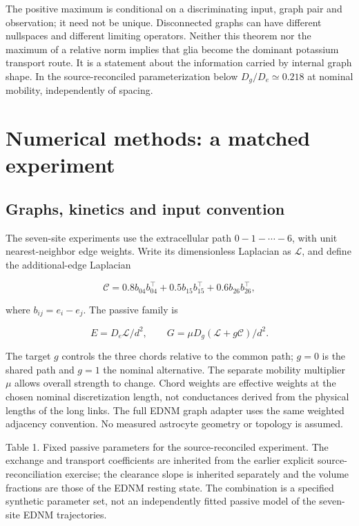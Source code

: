 \documentclass[
  11pt,
]{article}
\begin{document}
The positive maximum is conditional on a discriminating input, graph
pair and observation; it need not be unique. Disconnected graphs can
have different nullspaces and different limiting operators. Neither this
theorem nor the maximum of a relative norm implies that glia become the
dominant potassium transport route. It is a statement about the
information carried by internal graph shape. In the source-reconciled
parameterization below \(D_g/D_e\simeq0.218\) at nominal mobility,
independently of spacing.

\section{Numerical methods: a matched
experiment}\label{numerical-methods-a-matched-experiment}

\subsection{Graphs, kinetics and input
convention}\label{graphs-kinetics-and-input-convention}

The seven-site experiments use the extracellular path \(0-1-\cdots-6\),
with unit nearest-neighbor edge weights. Write its dimensionless
Laplacian as \(\mathcal L\), and define the additional-edge Laplacian

\[\mathcal C=0.8b_{04}b_{04}^\top+0.5b_{15}b_{15}^\top+0.6b_{26}b_{26}^\top,\]

where \(b_{ij}=e_i-e_j\). The passive family is

\[E=D_e\mathcal L/d^2,\qquad G=\mu D_g(\mathcal L+g\mathcal C)/d^2.\]

The target \(g\) controls the three chords relative to the common path;
\(g=0\) is the shared path and \(g=1\) the nominal alternative. The
separate mobility multiplier \(\mu\) allows overall strength to change.
Chord weights are effective weights at the chosen nominal discretization
length, not conductances derived from the physical lengths of the long
links. The full EDNM graph adapter uses the same weighted adjacency
convention. No measured astrocyte geometry or topology is assumed.

Table 1. Fixed passive parameters for the source-reconciled experiment.
The exchange and transport coefficients are inherited from the earlier
explicit source-reconciliation exercise; the clearance slope is
inherited separately and the volume fractions are those of the EDNM
resting state. The combination is a specified synthetic parameter set,
not an independently fitted passive model of the seven-site EDNM
trajectories.
\end{document}
